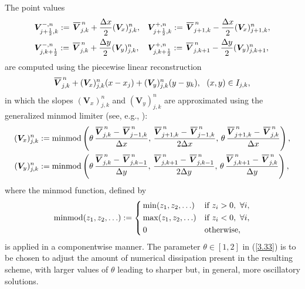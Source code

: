\documentclass[preprint,12pt]{elsarticle}
\newcommand{\dx}{\Delta x}
\newcommand{\dy}{\Delta y}
\newcommand{\kph}{{k+\frac{1}{2}}}
\newcommand{\jph}{{j+\frac{1}{2}}}
\newcommand{\bV}{\bm{V}}
\newcommand\eref[1]{(\ref{#1})}
\newcommand*\xbar[1]{%
	\hbox{%
		\vbox{%
			\hrule height 0.5pt %
			\kern0.4ex%
			\hbox{%
				\kern-0.05em%
				\ensuremath{#1}%
				\kern-0.00em%
			}%
		}%
	}%
}
\begin{document}
The point values
\begin{equation}
	\begin{aligned}
		&\bm V^{-,n}_{\jph,k}:=\,\xbar{\bm V}_{j,k}^{\,n}+\frac{\dx}{2}(\bm V_x)_{j,k}^n,&&
		\bm V^{+,n}_{\jph,k}:=\,\xbar{\bm V}_{j+1,k}^{\,n}-\frac{\dx}{2}(\bm V_x)_{j+1,k}^n,\\
		&\bm V^{-,n}_{j,\kph}:=\,\xbar{\bm V}_{j,k}^{\,n}+\frac{\dy}{2}(\bm V_y)_{j,k}^n,&&
		\bm V^{+,n}_{j,\kph}:=\,\xbar{\bm V}_{j,k+1}^{\,n}-\frac{\dy}{2}(\bm V_y)_{j,k+1}^n,
	\end{aligned}
	\label{3.33f}
\end{equation}
are computed using the piecewise linear reconstruction
$$
\xbar{\bm V}_{j,k}^{\,n}+(\bm V_x)_{j,k}^n(x-x_j)+(\bm V_y)_{j,k}^n(y-y_k),~~(x,y)\in I_{j,k},
$$
in which the slopes $(\bm V_x)_{j,k}^n$ and $(\bm V_y)_{j,k}^n$ are approximated using the generalized minmod limiter (see, e.g.,
\cite{LieNoe,nessyahu1990non,sweby1984high}):
\begin{equation}
	\begin{aligned}
		(\bV_x)_{j,k}^n&:={\rm minmod}\left(\theta\,\frac{\xbar{\bV}_{j,k}^{\,n}-\,\xbar{\bV}_{j-1,k}^{\,n}}{\dx},\,
		\frac{\xbar{\bV}_{j+1,k}^{\,n}-\,\xbar{\bV}_{j-1,k}^{\,n}}{2\dx},\,
		\theta\,\frac{\xbar{\bV}_{j+1,k}^{\,n}-\,\xbar{\bV}_{j,k}^{\,n}}{\dx}\right),\\
		(\bV_y)_{j,k}^n&:={\rm minmod}\left(\theta\,\frac{\xbar{\bV}_{j,k}^{\,n}-\,\xbar{\bV}_{j,k-1}^{\,n}}{\dy},\,
		\frac{\xbar{\bV}_{j,k+1}^{\,n}-\,\xbar{\bV}_{j,k-1}^{\,n}}{2\dy},\,
		\theta\,\frac{\xbar{\bV}_{j,k+1}^{\,n}-\,\xbar{\bV}_{j,k}^{\,n}}{\dy}\right),
	\end{aligned}
	\label{3.33}
\end{equation}
where the minmod function, defined by
\begin{equation*}
	{\rm minmod}(z_1,z_2,\ldots):=\left\{\begin{aligned}
		&\min(z_1,z_2,\ldots)&&\mbox{if}~z_i>0,~\forall i,\\
		&\max(z_1,z_2,\ldots)&&\mbox{if}~z_i<0,~\forall i,\\
		&\,0&&\mbox{otherwise},
	\end{aligned}\right.
\end{equation*}
is applied in a componentwise manner. The parameter $\theta\in[1,2]$ in \eref{3.33} is to be chosen to adjust the amount of numerical
dissipation present in the resulting scheme, with larger values of $\theta$ leading to sharper but, in general, more oscillatory solutions.
\end{document}
